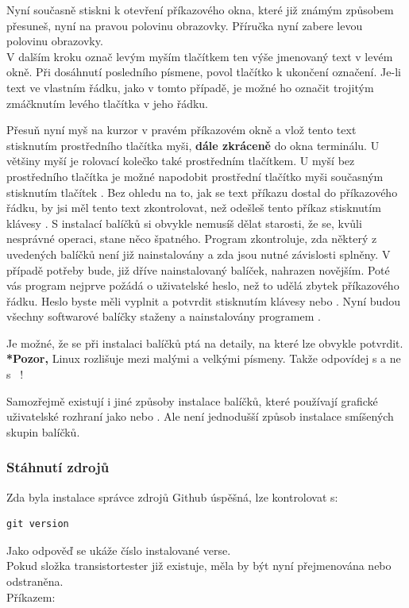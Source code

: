 Nyní současně stiskni  k otevření příkazového okna, které již známým způsobem přesuneš, nyní na pravou polovinu obrazovky. 
Příručka nyní zabere levou polovinu obrazovky.\\
V dalším kroku označ levým myším tlačítkem \LMB ten výše jmenovaný text v levém okně. Při dosáhnutí posledního písmene, povol tlačítko k ukončení označení.
Je-li text ve vlastním řádku, jako v tomto případě, je možné ho označit trojitým zmáčknutím levého tlačítka \LMB v jeho řádku.

Přesuň nyní myš na kurzor v pravém příkazovém okně a vlož tento text stisknutím prostředního tlačítka myši, \textbf{dále zkráceně \MMB} do okna terminálu.
U většiny myší je rolovací kolečko také prostředním tlačítkem.
U myší bez prostředního tlačítka je možné napodobit prostřední tlačítko myši současným stisknutím tlačítek \LRMB.
Bez ohledu na to, jak se text příkazu dostal do příkazového řádku, by jsi měl tento text zkontrolovat, než odešleš tento příkaz stisknutím klávesy
 \keys{\enter}.
S instalací balíčků si obvykle nemusíš dělat starosti, že se, kvůli nesprávné operaci, stane něco špatného.
Program  zkontroluje, zda některý z uvedených balíčků není již nainstalovány a zda jsou nutné závislosti splněny.
V případě potřeby bude, již dříve nainstalovaný balíček, nahrazen novějším.
Poté vás program  nejprve požádá o uživatelské heslo, než to udělá zbytek příkazového řádku.
Heslo byste měli vyplnit a potvrdit stisknutím klávesy \keys{\enter} nebo \keys {\return}.
Nyní budou všechny softwarové balíčky staženy a nainstalovány programem .

Je možné, že se  při instalaci balíčků ptá na detaily, na které lze obvykle potvrdit.   
\\ \textbf{*Pozor,} Linux rozlišuje mezi malými a velkými písmeny. Takže odpovídej s  a ne s ~!

Samozřejmě existují i ​​jiné způsoby instalace balíčků, které používají grafické uživatelské rozhraní
jako  nebo . Ale není jednodušší způsob instalace smíšených skupin balíčků. 
\vspace*{-0.3em} 
\subsubsection{Stáhnutí zdrojů}
Zda byla instalace správce zdrojů Github úspěšná, lze kontrolovat s:
\begin{large} \vspace{-0.4em} \begin{verbatim}
git version
\end{verbatim} \end{large}
Jako odpověď se ukáže číslo instalované verse.\\ 
Pokud složka transistortester již existuje, měla by být nyní přejmenována nebo odstraněna. \\
Příkazem:

